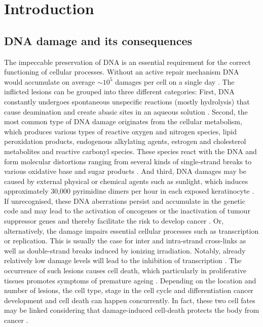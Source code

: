 \chapter{Introduction}
\pagestyle{plain}

\section{DNA damage and its consequences}
\label{sec:intro_DNAdamage}
The impeccable preservation of DNA is an essential requirement for the correct functioning of cellular processes. Without an active repair mechanism DNA would accumulate on average $\sim$$\text{10}^\text{5}$ damages per cell on a single day \cite{Hoeijmakers2009}. The inflicted lesions can be grouped into three different categories: First, DNA constantly undergoes spontaneous unspecific reactions (mostly hydrolysis) that cause deamination and create abasic sites in an aqueous solution \cite{Lindahl1993,Lhomme1999}. Second, the most common type of DNA damage originates from the cellular metabolism, which produces various types of reactive oxygen and nitrogen species, lipid peroxidation products, endogenous alkylating agents, estrogen and cholesterol metabolites and reactive carbonyl species. These species react with the DNA and form molecular distortions ranging from several kinds of single-strand breaks to various oxidative base and sugar products \cite{DeBont2004,Sander2005}. And third, DNA damages may be caused by external physical or chemical agents such as sunlight, which induces approximately 30,000 pyrimidine dimers per hour in each exposed keratinocyte \cite{Luijsterburg2010}.\\        
If unrecognised, these DNA aberrations persist and accumulate in the genetic code and may lead to the activation of  oncogenes or the inactivation of tumour suppressor genes and thereby facilitate the risk to develop cancer \cite{Bartek2007}. Or, alternatively, the damage impairs essential cellular processes such as transcription or replication. This is usually the case for inter and intra-strand cross-links as well as double-strand breaks induced by ionizing irradiation. Notably, already relatively low damage levels will lead to the inhibition of transcription \cite{Mone2001}. The occurrence of such lesions causes cell death, which particularly in proliferative tissues promotes symptoms of premature ageing \cite{Marteijn2014}. Depending on the location and number of lesions, the cell type, stage in the cell cycle and differentiation cancer development and cell death can happen concurrently. In fact, these two cell fates may be linked considering that damage-induced cell-death protects the body from cancer \cite{Hoeijmakers2009}.            

